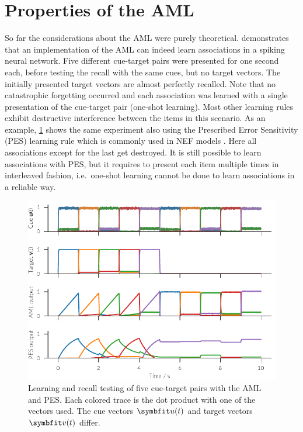 \section{Properties of the AML}
So far the considerations about the AML were purely theoretical.
 demonstrates that an implementation of the AML can indeed learn associations in a spiking neural network.
Five different cue-target pairs were presented for one second each, before testing the recall with the same cues, but no target vectors.
The initially presented target vectors are almost perfectly recalled.
Note that no catastrophic forgetting occurred and each association was learned with a single presentation of the cue-target pair (one-shot learning).
Most other learning rules exhibit destructive interference between the items in this scenario.
As an example, \cref{fig:aml} shows the same experiment also using the Prescribed Error Sensitivity (PES) learning rule \parencite{bekolay2013} which is commonly used in NEF models \parencite[e.g.,][]{komer2015,Rasmussen2017}.
Here all associations except for the last get destroyed.
It is still possible to learn associations with PES, but it requires to present each item multiple times in interleaved fashion, i.e.\ one-shot learning cannot be done to learn associations in a reliable way.
\begin{figure}
    \centering
    \includegraphics{figures/aml}
    \caption[Learning and recall testing of five cue-target pairs with the AML and PES]{Learning and recall testing of five cue-target pairs with the AML and PES\@. Each colored trace is the dot product with one of the vectors used. The cue vectors $\vc u(t)$ and target vectors $\vc v(t)$ differ.}\label{fig:aml}
\end{figure}

